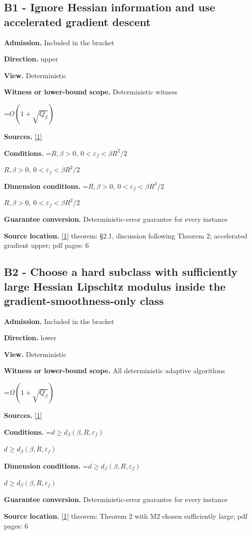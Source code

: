 \documentclass[10pt,a4paper]{article}
\newcommand{\AtlasMath}[1]{\par\begingroup\centering\setbox0=\hbox{$\displaystyle #1$}\ifdim\wd0>1.4\linewidth\typeout{ATLAS WIDE FORMULA: \the\wd0}\fi\ifdim\wd0>\linewidth\resizebox{\linewidth}{!}{\box0}\else\box0\fi\par\endgroup}
\newcommand{\AtlasInlineMath}[1]{\begingroup\setbox0=\hbox{$#1$}\ifdim\wd0>.4\linewidth\endgroup\AtlasMath{#1}\else\endgroup$#1$\fi}
\begin{document}
\subsection{B1 - Ignore Hessian information and use accelerated gradient descent}
\textbf{Admission.} Included in the bracket

\textbf{Direction.} upper

\textbf{View.} Deterministic

\textbf{Witness or lower-bound scope.} Deterministic witness

\AtlasMath{O(1+\sqrt{Q_\beta})}
\textbf{Sources.} \href{https://arxiv.org/pdf/1705.07260v2}{[1]}

\textbf{Conditions.} \AtlasInlineMath{R,\beta>0,\ 0<\varepsilon_f<\beta R^2/2}

\textbf{Dimension conditions.} \AtlasInlineMath{R,\beta>0,\ 0<\varepsilon_f<\beta R^2/2}

\textbf{Guarantee conversion.} Deterministic-error guarantee for every instance

\textbf{Source location.} \href{https://arxiv.org/pdf/1705.07260v2}{[1]} theorem: §2.1, discussion following Theorem 2; accelerated gradient upper; pdf pages: 6

\subsection{B2 - Choose a hard subclass with sufficiently large Hessian Lipschitz modulus inside the gradient-smoothness-only class}
\textbf{Admission.} Included in the bracket

\textbf{Direction.} lower

\textbf{View.} Deterministic

\textbf{Witness or lower-bound scope.} All deterministic adaptive algorithms

\AtlasMath{\Omega(1+\sqrt{Q_\beta})}
\textbf{Sources.} \href{https://arxiv.org/pdf/1705.07260v2}{[1]}

\textbf{Conditions.} \AtlasInlineMath{d\ge d_{\beta}(\beta,R,\varepsilon_f)}

\textbf{Dimension conditions.} \AtlasInlineMath{d\ge d_{\beta}(\beta,R,\varepsilon_f)}

\textbf{Guarantee conversion.} Deterministic-error guarantee for every instance

\textbf{Source location.} \href{https://arxiv.org/pdf/1705.07260v2}{[1]} theorem: Theorem 2 with M2 chosen sufficiently large; pdf pages: 6
\end{document}
